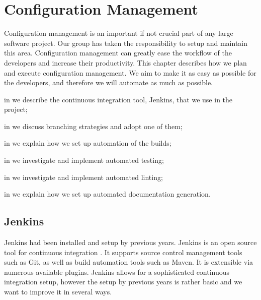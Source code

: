 \chapter{Configuration Management}\label{chap:config_management}
Configuration management is an important if not crucial part of any large software project. Our group has taken the responsibility to setup and maintain this area. Configuration management can greatly ease the workflow of the developers and increase their productivity. This chapter describes how we plan and execute configuration management. We aim to make it as easy as possible for the developers, and therefore we will automate as much as possible.

\begin{chapterorganization}
  \item in  we describe the continuous integration tool, Jenkins, that we use in the project;
  \item in  we discuss branching strategies and adopt one of them;
  \item in  we explain how we set up automation of the builds;
  \item in  we investigate and implement automated testing;
  \item in  we investigate and implement automated linting;
  \item in  we explain how we set up automated documentation generation.
\end{chapterorganization}

\section{Jenkins}\label{sec:jenkins}
Jenkins had been installed and setup by previous years. Jenkins is an open source tool for continuous integration \parencite{JenkinsWebsite}. It supports source control management tools such as Git, as well as build automation tools such as Maven. It is extensible via numerous available plugins. Jenkins allows for a sophisticated continuous integration setup, however the setup by previous years is rather basic and we want to improve it in several ways. 

